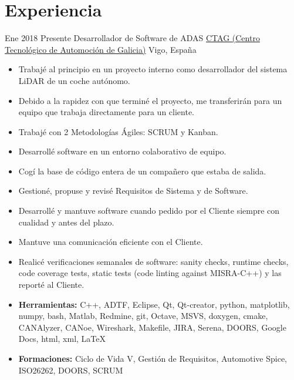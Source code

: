 \documentclass[letterpaper]{twentysecondcv} %
\begin{document}
\makeprofile %


\section{Experiencia}

\begin{twenty} %
\twentyitem
        {Ene 2018}
        {Presente}
        {Desarrollador de Software de ADAS}
        {\href{https://www.ctag.com/}{CTAG (Centro Tecnológico de Automoción de Galicia)}}
        {Vigo, España}
        {\begin{itemize}
        \item Trabajé al principio en un proyecto interno como desarrollador del sistema LiDAR de un coche autónomo.
        \item Debido a la rapidez con que terminé el proyecto, me transferirán para un equipo que trabaja directamente para un cliente.
        \item Trabajé con 2 Metodologías Ágiles: SCRUM y Kanban.
        \item Desarrollé software en un entorno colaborativo de equipo.
        \item Cogí la base de código entera de un compañero que estaba de salida.
        \item Gestioné, propuse y revisé Requisitos de Sistema y de Software.
        \item Desarrollé y mantuve software cuando pedido por el Cliente siempre con cualidad y antes del plazo.
        \item Mantuve una comunicación eficiente con el Cliente.
        \item Realicé verificaciones semanales de software: sanity checks, runtime checks, code coverage tests, static tests (code linting against MISRA-C++) y las reporté al Cliente.
        \item \textbf{Herramientas:} C++, ADTF, Eclipse, Qt, Qt-creator, python, matplotlib, numpy, bash, Matlab, Redmine, git, Octave, MSVS, doxygen, cmake, CANAlyzer, CANoe, Wireshark, Makefile, JIRA, Serena, DOORS, Google Docs, html, xml, \LaTeX
        \item \textbf{Formaciones:} Ciclo de Vida V, Gestión de Requisitos, Automotive Spice, ISO26262, DOORS, SCRUM 

\end{itemize}}
\end{twenty}
\end{document}
